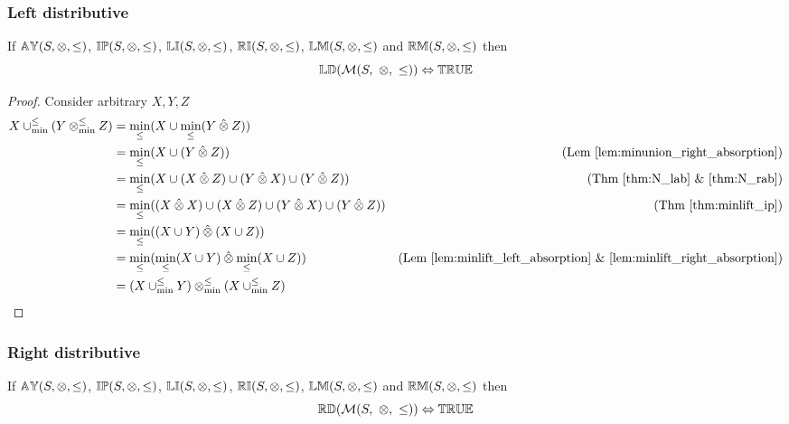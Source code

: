 \documentclass[../Summary.tex]{subfiles}
\begin{document}
\subsubsection{Left distributive}

\begin{theorem} \label{thm:M_ld}
If ${\mathbb{AY}}(S,\otimes,\leq)$, ${\mathbb{IP}}(S,\otimes,\leq)$, ${\mathbb{LI}}(S,\otimes,\leq)$, ${\mathbb{RI}}(S,\otimes,\leq)$, ${\mathbb{LM}}(S,\otimes,\leq)$ and ${\mathbb{RM}}(S,\otimes,\leq)$ then
\begin{equation*}
\propname{LD}(\mathcal{M}(S,\ \otimes,\ \leq))  \Leftrightarrow \propname{TRUE}
\end{equation*}
\end{theorem}

\begin{proof}

\vspace{0.5em}
Consider arbitrary $X,Y,Z$
\begin{align*}
X \mathbin{\cup_{\min}^{\leq}} (Y \mathbin{\otimes_{\min}^{\leq}} Z) 	& = \min_\leq(X \cup \min_\leq(Y \mathbin{\hat{\otimes}} Z)) \\
							& = \min_\leq(X \cup (Y \mathbin{\hat{\otimes}} Z)) & \text{(Lem \ref{lem:minunion_right_absorption})} \\
							& = \min_\leq(X \cup (X \mathbin{\hat{\otimes}} Z) \cup (Y \mathbin{\hat{\otimes}} X) \cup (Y \mathbin{\hat{\otimes}} Z)) & \text{(Thm \ref{thm:N_lab} \& \ref{thm:N_rab})} \\
							& = \min_\leq((X \mathbin{\hat{\otimes}} X) \cup (X \mathbin{\hat{\otimes}} Z) \cup (Y \mathbin{\hat{\otimes}} X) \cup (Y \mathbin{\hat{\otimes}} Z)) & \text{(Thm \ref{thm:minlift_ip})} \\
							& = \min_\leq((X \cup Y) \mathbin{\hat{\otimes}} (X \cup Z)) \\
							& = \min_\leq(\min_\leq(X \cup Y) \mathbin{\hat{\otimes}} \min_\leq(X \cup Z)) & \text{(Lem \ref{lem:minlift_left_absorption} \& \ref{lem:minlift_right_absorption})} \\
							& = (X \mathbin{\cup_{\min}^{\leq}} Y) \mathbin{\otimes_{\min}^{\leq}} (X \mathbin{\cup_{\min}^{\leq}} Z)
\end{align*}
\end{proof}





\subsubsection{Right distributive}

\begin{theorem} \label{thm:M_rd}
If ${\mathbb{AY}}(S,\otimes,\leq)$, ${\mathbb{IP}}(S,\otimes,\leq)$, ${\mathbb{LI}}(S,\otimes,\leq)$, ${\mathbb{RI}}(S,\otimes,\leq)$, ${\mathbb{LM}}(S,\otimes,\leq)$ and ${\mathbb{RM}}(S,\otimes,\leq)$ then
\begin{equation*}
\propname{RD}(\mathcal{M}(S,\ \otimes,\ \leq))  \Leftrightarrow \propname{TRUE}
\end{equation*}
\end{theorem}
\end{document}
